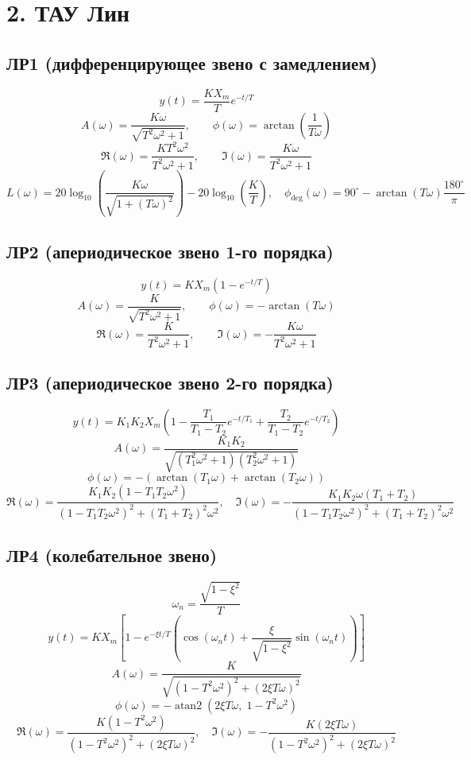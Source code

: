 \documentclass[12pt,a4paper]{article}
\begin{document}
\section*{2. ТАУ Лин}

\subsection*{ЛР1 (дифференцирующее звено с замедлением)}
\[
y(t)=\frac{KX_m}{T}e^{-t/T}
\]
\[
A(\omega)=\frac{K\omega}{\sqrt{T^2\omega^2+1}},
\qquad
\phi(\omega)=\arctan\left(\frac{1}{T\omega}\right)
\]
\[
\Re(\omega)=\frac{KT^2\omega^2}{T^2\omega^2+1},
\qquad
\Im(\omega)=\frac{K\omega}{T^2\omega^2+1}
\]
\[
L(\omega)=20\log_{10}\left(\frac{K\omega}{\sqrt{1+(T\omega)^2}}\right)-20\log_{10}\left(\frac{K}{T}\right),
\quad
\phi_{\mathrm{deg}}(\omega)=90^\circ-\arctan(T\omega)\frac{180^\circ}{\pi}
\]

\subsection*{ЛР2 (апериодическое звено 1-го порядка)}
\[
y(t)=KX_m\left(1-e^{-t/T}\right)
\]
\[
A(\omega)=\frac{K}{\sqrt{T^2\omega^2+1}},
\qquad
\phi(\omega)=-\arctan(T\omega)
\]
\[
\Re(\omega)=\frac{K}{T^2\omega^2+1},
\qquad
\Im(\omega)=-\frac{K\omega}{T^2\omega^2+1}
\]

\subsection*{ЛР3 (апериодическое звено 2-го порядка)}
\[
y(t)=K_1K_2X_m\left(1-\frac{T_1}{T_1-T_2}e^{-t/T_1}+\frac{T_2}{T_1-T_2}e^{-t/T_2}\right)
\]
\[
A(\omega)=\frac{K_1K_2}{\sqrt{(T_1^2\omega^2+1)(T_2^2\omega^2+1)}}
\]
\[
\phi(\omega)=-(\arctan(T_1\omega)+\arctan(T_2\omega))
\]
\[
\Re(\omega)=\frac{K_1K_2(1-T_1T_2\omega^2)}{(1-T_1T_2\omega^2)^2+(T_1+T_2)^2\omega^2},
\quad
\Im(\omega)=-\frac{K_1K_2\omega(T_1+T_2)}{(1-T_1T_2\omega^2)^2+(T_1+T_2)^2\omega^2}
\]

\subsection*{ЛР4 (колебательное звено)}
\[
\omega_n=\frac{\sqrt{1-\xi^2}}{T}
\]
\[
y(t)=KX_m\left[1-e^{-\xi t/T}\left(\cos(\omega_nt)+\frac{\xi}{\sqrt{1-\xi^2}}\sin(\omega_nt)\right)\right]
\]
\[
A(\omega)=\frac{K}{\sqrt{(1-T^2\omega^2)^2+(2\xi T\omega)^2}}
\]
\[
\phi(\omega)=-\operatorname{atan2}(2\xi T\omega,\;1-T^2\omega^2)
\]
\[
\Re(\omega)=\frac{K(1-T^2\omega^2)}{(1-T^2\omega^2)^2+(2\xi T\omega)^2},
\quad
\Im(\omega)=-\frac{K(2\xi T\omega)}{(1-T^2\omega^2)^2+(2\xi T\omega)^2}
\]
\end{document}
